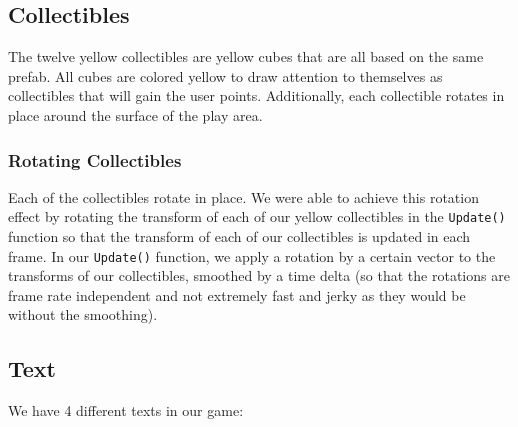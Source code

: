 \documentclass[12pt]{article}
\begin{document}
\subsection{Collectibles}
  The twelve yellow collectibles are yellow cubes that are all based on the same prefab. All cubes are colored yellow to draw attention to themselves as collectibles that will gain the user points. Additionally, each collectible rotates in place around the surface of the play area.

\subsubsection{Rotating Collectibles}
  Each of the collectibles rotate in place. We were able to achieve this rotation effect by rotating the transform of each of our yellow collectibles in the \verb+Update()+ function so that the transform of each of our collectibles is updated in each frame. In our \verb+Update()+ function, we apply a rotation by a certain vector to the transforms of our collectibles, smoothed by a time delta (so that the rotations are frame rate independent and not extremely fast and jerky as they would be without the smoothing).

\subsection{Text}

We have 4 different texts in our game:
\end{document}
